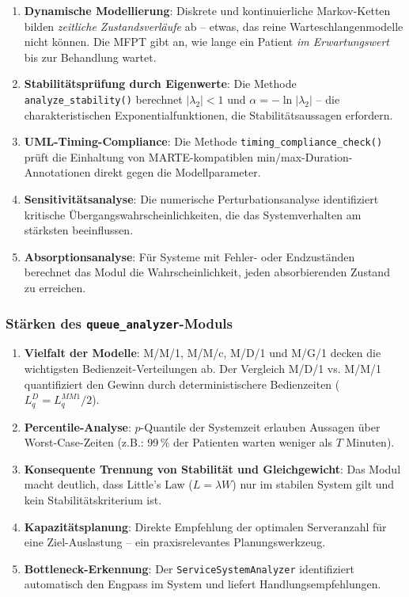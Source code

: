 ﻿\documentclass[a4paper,12pt]{scrreprt}
\theoremstyle{definition}
\begin{document}
\begin{enumerate}
	\item[-] \textbf{Dynamische Modellierung}: Diskrete und kontinuierliche
	Markov-Ketten bilden \emph{zeitliche Zustandsverläufe} ab -- etwas,
	das reine Warteschlangenmodelle nicht können. Die MFPT gibt an, wie
	lange ein Patient \emph{im Erwartungswert} bis zur Behandlung wartet.
	\item[-] \textbf{Stabilitätsprüfung durch Eigenwerte}: Die Methode
	\texttt{analyze\_stability()} berechnet $|\lambda_2| < 1$ und
	$\alpha = -\ln|\lambda_2|$ -- die charakteristischen Exponentialfunktionen,
	die Stabilitätsaussagen erfordern.
	\item[-] \textbf{UML-Timing-Compliance}: Die Methode
	\texttt{timing\_compliance\_check()} prüft die Einhaltung von
	MARTE-kompatiblen min/max-Duration-Annotationen direkt gegen die
	Modellparameter.
	\item[-] \textbf{Sensitivitätsanalyse}: Die numerische Perturbationsanalyse
	identifiziert kritische Übergangswahrscheinlichkeiten, die das
	Systemverhalten am stärksten beeinflussen.
	\item[-] \textbf{Absorptionsanalyse}: Für Systeme mit Fehler- oder
	Endzuständen berechnet das Modul die Wahrscheinlichkeit, jeden
	absorbierenden Zustand zu erreichen.
\end{enumerate}

\subsubsection{Stärken des \texttt{queue\_analyzer}-Moduls}

\begin{enumerate}
	\item[-] \textbf{Vielfalt der Modelle}: M/M/1, M/M/c, M/D/1 und M/G/1
	decken die wichtigsten Bedienzeit-Verteilungen ab. Der Vergleich
	M/D/1 vs. M/M/1 quantifiziert den Gewinn durch deterministischere
	Bedienzeiten ($L_q^D = L_q^{MM1}/2$).
	\item[-] \textbf{Percentile-Analyse}: $p$-Quantile der Systemzeit erlauben
	Aussagen über Worst-Case-Zeiten (z.B.: 99\,\% der Patienten warten
	weniger als $T$ Minuten).
	\item[-] \textbf{Konsequente Trennung von Stabilität und Gleichgewicht}:
	Das Modul macht deutlich, dass Little's Law ($L = \lambda W$) nur im
	stabilen System gilt und kein Stabilitätskriterium ist.
	\item[-] \textbf{Kapazitätsplanung}: Direkte Empfehlung der optimalen
	Serveranzahl für eine Ziel-Auslastung -- ein praxisrelevantes
	Planungswerkzeug.
	\item[-] \textbf{Bottleneck-Erkennung}: Der \texttt{ServiceSystemAnalyzer}
	identifiziert automatisch den Engpass im System und liefert
	Handlungsempfehlungen.
\end{enumerate}
\end{document}
